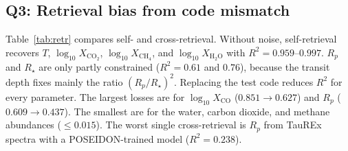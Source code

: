 \subsection{Q3: Retrieval bias from code mismatch}
\label{sec:res_q3}

Table~\ref{tab:retr} compares self- and cross-retrieval.
Without noise, self-retrieval recovers $T$, $\log_{10}X_{\mathrm{CO_2}}$, $\log_{10}X_{\mathrm{CH_4}}$, and $\log_{10}X_{\mathrm{H_2O}}$ with $R^2=0.959$--$0.997$.
$R_p$ and $R_\star$ are only partly constrained ($R^2=0.61$ and $0.76$), because the transit depth fixes mainly the ratio $(R_p/R_\star)^2$.
Replacing the test code reduces $R^2$ for every parameter.
The largest losses are for $\log_{10}X_{\mathrm{CO}}$ ($0.851\rightarrow0.627$) and $R_p$ ($0.609\rightarrow0.437$).
The smallest are for the water, carbon dioxide, and methane abundances ($\leq0.015$).
The worst single cross-retrieval is $R_p$ from TauREx spectra with a POSEIDON-trained model ($R^2=0.238$).

\begin{table}[t]
  \centering
  \caption{XGBoost retrieval $R^2$ on test planets. Self: mean over the three codes ($b=a$). Cross: mean over the six pairs ($b\neq a$). Gap: self minus cross. Models are trained without noise; the noisy rows apply the same models to test spectra with white noise. In the gap rows, bold marks the largest and underline the second-largest self--cross gap.}
  \label{tab:retr}
\end{table}

